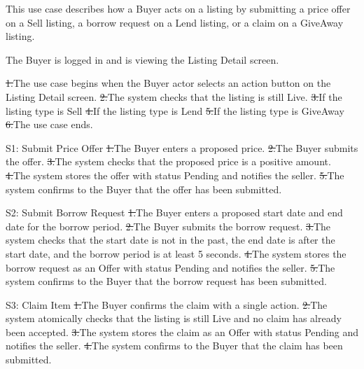 This use case describes how a Buyer acts on a listing by submitting a price offer on a Sell listing, a borrow request on a Lend listing, or a claim on a GiveAway listing.\par
{}
The Buyer is logged in and is viewing the Listing Detail screen.\par
{}
\st{1.}{The use case begins when the Buyer actor selects an action button on the Listing Detail screen.}
\st{2.}{The system checks that the listing is still Live.}
\st{3.}{If the listing type is Sell}
\st{4.}{If the listing type is Lend}
\st{5.}{If the listing type is GiveAway}
\st{6.}{The use case ends.}
\begin{flowblock}{S1: Submit Price Offer}
\st{1.}{The Buyer enters a proposed price.}
\st{2.}{The Buyer submits the offer.}
\st{3.}{The system checks that the proposed price is a positive amount.}
\st{4.}{The system stores the offer with status Pending and notifies the seller.}
\st{5.}{The system confirms to the Buyer that the offer has been submitted.}
\end{flowblock}
\begin{flowblock}{S2: Submit Borrow Request}
\st{1.}{The Buyer enters a proposed start date and end date for the borrow period.}
\st{2.}{The Buyer submits the borrow request.}
\st{3.}{The system checks that the start date is not in the past, the end date is after the start date, and the borrow period is at least 5 seconds.}
\st{4.}{The system stores the borrow request as an Offer with status Pending and notifies the seller.}
\st{5.}{The system confirms to the Buyer that the borrow request has been submitted.}
\end{flowblock}
\begin{flowblock}{S3: Claim Item}
\st{1.}{The Buyer confirms the claim with a single action.}
\st{2.}{The system atomically checks that the listing is still Live and no claim has already been accepted.}
\st{3.}{The system stores the claim as an Offer with status Pending and notifies the seller.}
\st{4.}{The system confirms to the Buyer that the claim has been submitted.}
\end{flowblock}
